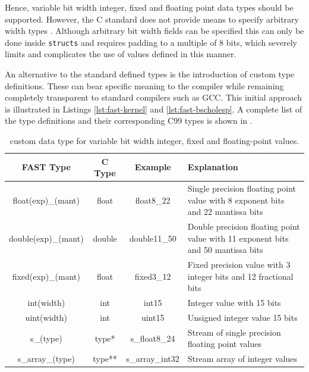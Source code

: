 Hence, variable bit width integer, fixed and floating point data types
should be supported. However, the C standard does not provide means to
specify arbitrary width types \cite[pp. 33]{Cstandard}.  Although
arbitrary bit width fields can be specified this can only be done
inside \texttt{structs} and requires padding to a multiple of 8 bits,
which severely limits and complicates the use of values defined in
this manner.

An alternative to the standard defined types is the introduction of
custom type definitions. These can bear specific meaning to the
\fastc{} compiler while remaining completely transparent to standard
compilers such as GCC. This initial approach is illustrated in
Listings \ref{lst:fast-kernel} and \ref{lst:fast-bscholesp}. A
complete list of the type definitions and their corresponding C99 types
is shown in .

\begin{table}[ht!]
\begin{tabularx}{\textwidth}{c|c|c|X}
\textbf{FAST Type}  & \textbf{C Type} & \textbf{Example} & \textbf{Explanation}                                                             \\
\hline \hline
float(exp)\_(mant)  & float           & float8\_22       & Single precision floating point value with 8 exponent bits and 22 mantissa bits  \\
double(exp)\_(mant) & double          & double11\_50     & Double precision floating point value with 11 exponent bits and 50 mantissa bits \\
fixed(exp)\_(mant)  & float           & fixed3\_12       & Fixed precision value with 3 integer bits and 12 fractional bits                 \\
int(width)          & int             & int15            & Integer value with 15 bits                                                       \\
uint(width)         & int             & uint15           & Unsigned integer value 15 bits                                                   \\
s\_(type)           & type*           & s\_float8\_24    & Stream of single precision floating point values                                 \\
s\_array\_(type)    & type**          & s\_array\_int32  & Stream array of integer values                                                   \\
\end{tabularx}
\caption{\FAST{} custom data type for variable bit width integer, fixed and floating-point values.}
\label{table:data-type}
\end{table}


